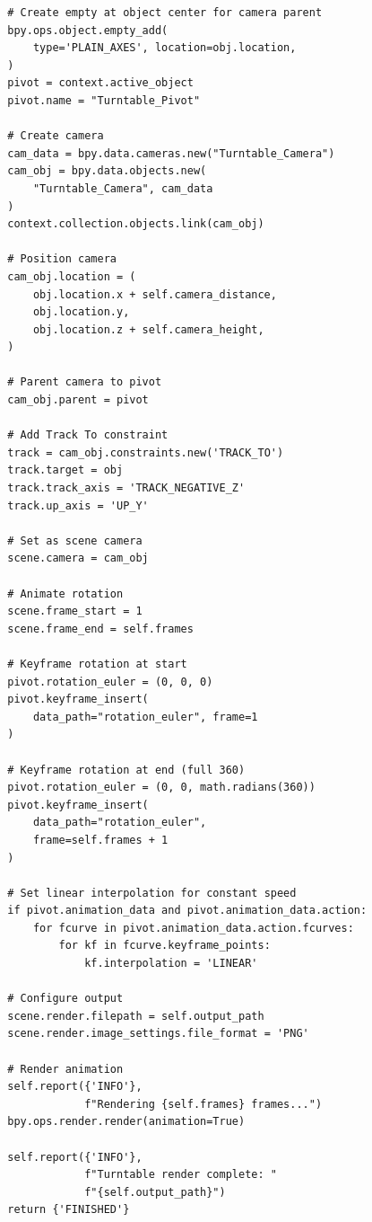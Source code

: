 \begin{lstlisting}
        # Create empty at object center for camera parent
        bpy.ops.object.empty_add(
            type='PLAIN_AXES', location=obj.location,
        )
        pivot = context.active_object
        pivot.name = "Turntable_Pivot"

        # Create camera
        cam_data = bpy.data.cameras.new("Turntable_Camera")
        cam_obj = bpy.data.objects.new(
            "Turntable_Camera", cam_data
        )
        context.collection.objects.link(cam_obj)

        # Position camera
        cam_obj.location = (
            obj.location.x + self.camera_distance,
            obj.location.y,
            obj.location.z + self.camera_height,
        )

        # Parent camera to pivot
        cam_obj.parent = pivot

        # Add Track To constraint
        track = cam_obj.constraints.new('TRACK_TO')
        track.target = obj
        track.track_axis = 'TRACK_NEGATIVE_Z'
        track.up_axis = 'UP_Y'

        # Set as scene camera
        scene.camera = cam_obj

        # Animate rotation
        scene.frame_start = 1
        scene.frame_end = self.frames

        # Keyframe rotation at start
        pivot.rotation_euler = (0, 0, 0)
        pivot.keyframe_insert(
            data_path="rotation_euler", frame=1
        )

        # Keyframe rotation at end (full 360)
        pivot.rotation_euler = (0, 0, math.radians(360))
        pivot.keyframe_insert(
            data_path="rotation_euler",
            frame=self.frames + 1
        )

        # Set linear interpolation for constant speed
        if pivot.animation_data and pivot.animation_data.action:
            for fcurve in pivot.animation_data.action.fcurves:
                for kf in fcurve.keyframe_points:
                    kf.interpolation = 'LINEAR'

        # Configure output
        scene.render.filepath = self.output_path
        scene.render.image_settings.file_format = 'PNG'

        # Render animation
        self.report({'INFO'},
                    f"Rendering {self.frames} frames...")
        bpy.ops.render.render(animation=True)

        self.report({'INFO'},
                    f"Turntable render complete: "
                    f"{self.output_path}")
        return {'FINISHED'}


\end{lstlisting}
